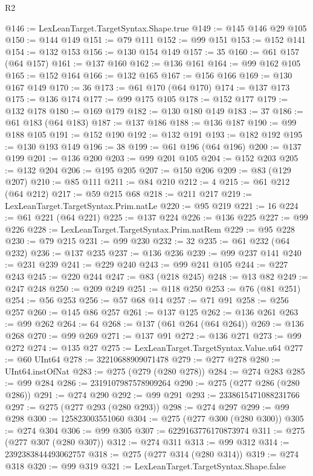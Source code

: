 \begin{lexlean}{R2}
\begin{coremodule}
@146 := LexLeanTarget.TargetSyntax.Shape.true
@149 := @145 @146 @29 @105
@150 := @144 @149
@151 := @79 @111
@152 := @99 @151
@153 := @152 @141
@154 := @132 @153
@156 := @130 @154 @149
@157 := 35
@160 := @61 @157 (@64 @157)
@161 := @137 @160
@162 := @136 @161
@164 := @99 @162 @105
@165 := @152 @164
@166 := @132 @165
@167 := @156 @166
@169 := @130 @167 @149
@170 := 36
@173 := @61 @170 (@64 @170)
@174 := @137 @173
@175 := @136 @174
@177 := @99 @175 @105
@178 := @152 @177
@179 := @132 @178
@180 := @169 @179
@182 := @130 @180 @149
@183 := 37
@186 := @61 @183 (@64 @183)
@187 := @137 @186
@188 := @136 @187
@190 := @99 @188 @105
@191 := @152 @190
@192 := @132 @191
@193 := @182 @192
@195 := @130 @193 @149
@196 := 38
@199 := @61 @196 (@64 @196)
@200 := @137 @199
@201 := @136 @200
@203 := @99 @201 @105
@204 := @152 @203
@205 := @132 @204
@206 := @195 @205
@207 := @150 @206
@209 := @83 (@129 @207)
@210 := @85 @111
@211 := @84 @210
@212 := 4
@215 := @61 @212 (@64 @212)
@217 := @59 @215 @68
@218 := @211 @217
@219 := LexLeanTarget.TargetSyntax.Prim.natLe
@220 := @95 @219
@221 := 16
@224 := @61 @221 (@64 @221)
@225 := @137 @224
@226 := @136 @225
@227 := @99 @226
@228 := LexLeanTarget.TargetSyntax.Prim.natRem
@229 := @95 @228
@230 := @79 @215
@231 := @99 @230
@232 := 32
@235 := @61 @232 (@64 @232)
@236 := @137 @235
@237 := @136 @236
@239 := @99 @237 @141
@240 := @231 @239
@241 := @229 @240
@243 := @99 @241 @105
@244 := @227 @243
@245 := @220 @244
@247 := @83 (@218 @245)
@248 := @13 @82
@249 := @247 @248
@250 := @209 @249
@251 := @118 @250
@253 := @76 (@81 @251)
@254 := @56 @253
@256 := @57 @68 @14
@257 := @71 @91
@258 := @256 @257
@260 := @145 @86 @257
@261 := @137 @125
@262 := @136 @261
@263 := @99 @262
@264 := 64
@268 := @137 (@61 @264 (@64 @264))
@269 := @136 @268
@270 := @99 @269
@271 := @137 @91
@272 := @136 @271
@273 := @99 @272
@274 := @135 @27
@275 := LexLeanTarget.TargetSyntax.Value.u64
@277 := @60 UInt64
@278 := 32210688909071478
@279 := @277 @278
@280 := UInt64.instOfNat
@283 := @275 (@279 (@280 @278))
@284 := @274 @283
@285 := @99 @284
@286 := 2319107987578909264
@290 := @275 (@277 @286 (@280 @286))
@291 := @274 @290
@292 := @99 @291
@293 := 2338615471088231766
@297 := @275 (@277 @293 (@280 @293))
@298 := @274 @297
@299 := @99 @298
@300 := 125823003551060
@304 := @275 (@277 @300 (@280 @300))
@305 := @274 @304
@306 := @99 @305
@307 := 6229163776170873974
@311 := @275 (@277 @307 (@280 @307))
@312 := @274 @311
@313 := @99 @312
@314 := 2392383844493062757
@318 := @275 (@277 @314 (@280 @314))
@319 := @274 @318
@320 := @99 @319
@321 := LexLeanTarget.TargetSyntax.Shape.false

\end{coremodule}
\end{lexlean}
